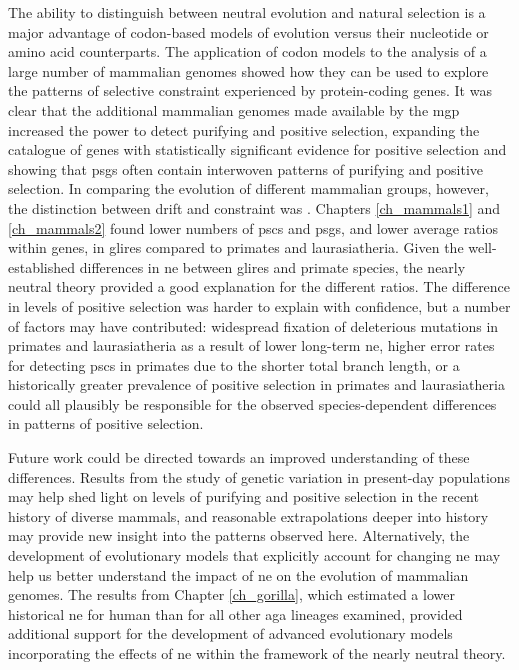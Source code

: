 The ability to distinguish between neutral evolution and natural
selection is a major advantage of codon-based models of evolution
versus their nucleotide or amino acid counterparts. The application of
codon models to the analysis of a large number of mammalian genomes
showed how they can be used to explore the patterns of selective
constraint experienced by protein-coding genes. It was clear that the
additional mammalian genomes made available by the \ac{mgp} increased
the power to detect purifying and positive selection, expanding the
catalogue of genes with statistically significant evidence for
positive selection and showing that \acp{psg} often contain interwoven
patterns of purifying and positive selection. In comparing the
evolution of different mammalian groups, however, the distinction
between drift and constraint was . Chapters
\ref{ch_mammals1} and \ref{ch_mammals2} found lower numbers of
\acp{psc} and \acp{psg}, and lower average \dnds ratios within genes,
in glires compared to primates and laurasiatheria. Given the
well-established differences in \ac{ne} between glires and primate
species, the nearly neutral theory provided a good explanation for the
different \dnds ratios. The difference in levels of positive selection
was harder to explain with confidence, but a number of factors may
have contributed: widespread fixation of deleterious mutations in
primates and laurasiatheria as a result of lower long-term \ac{ne},
higher error rates for detecting \acp{psc} in primates due to the
shorter total branch length, or a historically greater prevalence of
positive selection in primates and laurasiatheria could all plausibly
be responsible for the observed species-dependent differences in
patterns of positive selection.

Future work could be directed towards an improved understanding of
these differences. Results from the study of genetic variation in
present-day populations may help shed light on levels of purifying and
positive selection in the recent history of diverse mammals, and
reasonable extrapolations deeper into history may provide new insight
into the patterns observed here. Alternatively, the development of
evolutionary models that explicitly account for changing \ac{ne} may
help us better understand the impact of \ac{ne} on the evolution of
mammalian genomes. The results from Chapter \ref{ch_gorilla}, which
estimated a lower historical \ac{ne} for human than for all other
\ac{aga} lineages examined, provided additional support for the
development of advanced evolutionary models incorporating the effects
of \ac{ne} within the framework of the nearly neutral theory.

